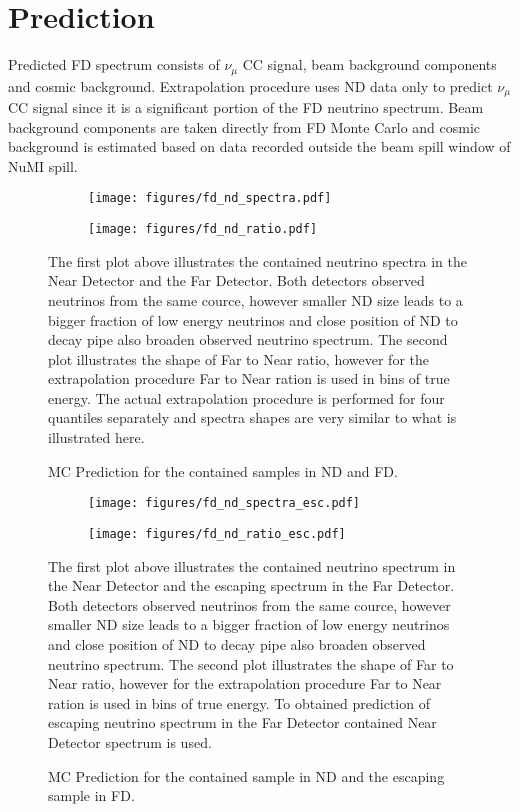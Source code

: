 \section{Prediction}
Predicted FD spectrum consists of $\nu_\mu$ CC signal, beam background components and cosmic background.
Extrapolation procedure uses ND data only to predict $\nu_\mu$ CC signal since it is a significant
portion of the FD neutrino spectrum. Beam background components are taken directly from FD Monte Carlo
and cosmic background is estimated based on data recorded outside the beam spill window of NuMI spill. 
\begin{figure}[th]
\centering
\begin{subfigure}[t]{0.95\textwidth}
  \centering
  \texttt{[image: figures/fd\_nd\_spectra.pdf]}
\end{subfigure}
\vspace{0.5cm}
\newline
\begin{subfigure}[t]{0.95\textwidth}
  \centering
  \texttt{[image: figures/fd\_nd\_ratio.pdf]}
\end{subfigure}
\caption{ MC Prediction for the contained samples in ND and FD. }
{ The first plot above illustrates the contained neutrino spectra in the Near Detector and the Far
Detector. Both detectors observed neutrinos from the same cource, however smaller ND size leads to
a bigger fraction of low energy neutrinos and close position of ND to decay pipe also broaden observed
neutrino spectrum. The second plot illustrates the shape of Far to Near ratio, however for the extrapolation
procedure Far to Near ration is used in bins of true energy. The actual extrapolation procedure is performed
for four quantiles separately and spectra shapes are very similar to what is illustrated here. }
\label{fig:ND_FD_shapes}
\end{figure}
\begin{figure}[th]
\centering
\begin{subfigure}[t]{0.95\textwidth}
  \centering
  \texttt{[image: figures/fd\_nd\_spectra\_esc.pdf]}
\end{subfigure}
\vspace{0.5cm}
\newline
\begin{subfigure}[t]{0.95\textwidth}
  \centering
  \texttt{[image: figures/fd\_nd\_ratio\_esc.pdf]}
\end{subfigure}
\caption{ MC Prediction for the contained sample in ND and the escaping sample in FD. }
{ The first plot above illustrates the contained neutrino spectrum in the Near Detector and the escaping spectrum
in the Far Detector. Both detectors observed neutrinos from the same cource, however smaller ND size leads to
a bigger fraction of low energy neutrinos and close position of ND to decay pipe also broaden observed
neutrino spectrum. The second plot illustrates the shape of Far to Near ratio, however for the extrapolation
procedure Far to Near ration is used in bins of true energy. To obtained prediction of escaping neutrino spectrum
in the Far Detector contained Near Detector spectrum is used. }
\label{fig:ND_FD_shapes_esc}
\end{figure}
